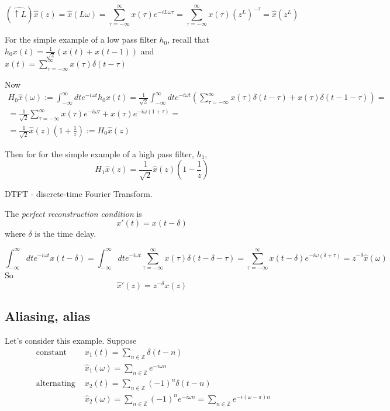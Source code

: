 \documentclass[twoside]{amsart}
\theoremstyle{plain}
\theoremstyle{definition}
\theoremstyle{remark}
\numberwithin{equation}{section}
\begin{document}
\begin{equation}
  (\widehat{\uparrow L})\widehat{x}(z) = \widehat{x}(L\omega) = \sum_{\tau=-\infty}^{\infty} x(\tau) e^{-iL\omega \tau} = \sum_{\tau=-\infty}^{\infty}x(\tau) (z^L)^{-\tau} = \widehat{x}(z^L)
\end{equation}

For the simple example of a low pass filter $h_0$, recall that $h_0x(t) = \frac{1}{\sqrt{2}} (x(t) + x(t-1))$ and \\
$x(t) = \sum_{\tau=-\infty}^{\infty}x(\tau) \delta(t-\tau)$

Now
\[
\begin{gathered}
H_0\widehat{x}(\omega) := \int_{-\infty}^{\infty}dt e^{-i \omega t} h_0x(t) = \frac{1}{\sqrt{2}} \int_{-\infty}^{\infty} dt e^{-i \omega t} \left( \sum_{\tau=-\infty}^{\infty} x(\tau) \delta(t-\tau) + x(\tau) \delta(t-1-\tau) \right) = \\
= \frac{1}{\sqrt{2}} \sum_{\tau=-\infty}^{\infty}x(\tau) e^{-i\omega \tau} + x(\tau) e^{-i \omega(1+\tau) } = \\
= \frac{1}{\sqrt{2}} \widehat{x}(z) \left( 1 + \frac{1}{z} \right) := H_0\widehat{x}(z)
\end{gathered}
\]

Then for for the simple example of a high pass filter, $h_1$,
\[
H_1\widehat{x}(z) = \frac{1}{\sqrt{2}} \widehat{x}(z)\left( 1- \frac{1}{z} \right)
\]

DTFT - discrete-time Fourier Transform.  

The \emph{perfect reconstruction condition} is
\[
x'(t) = x(t-\delta)
\]
where $\delta$ is the time delay.  

\[
\int_{-\infty}^{\infty}dt e^{-i\omega t} x(t-\delta) = \int_{-\infty}^{\infty}dt e^{-i\omega t} \sum_{\tau=-\infty}^{\infty} x(\tau) \delta(t- \delta - \tau ) = \sum_{\tau=-\infty}^{\infty} x(t-\delta) e^{-i \omega (\delta +\tau) } = z^{-\delta} \widehat{x}(\omega )
\]
So
\[
\widehat{x}'(z) = z^{-\delta}x(z)
\]




\subsection{Aliasing, alias}

Let's consider this example.  Suppose 
\[
\begin{aligned}
\text{ constant }  & x_1(t) = \sum_{n\in \mathbb{Z}} \delta(t-n) \\   
  & \widehat{x}_1(\omega) = \sum_{n\in \mathbb{Z}} e^{-i \omega n } \\ 
\text{ alternating }  & x_2(t) = \sum_{n\in \mathbb{Z}} (-1)^n \delta(t-n) \\ 
  & \widehat{x}_2(\omega) = \sum_{n\in \mathbb{Z}}(-1)^n e^{-i \omega n } = \sum_{n\in \mathbb{Z}} e^{-i ( \omega - \pi ) n }
\end{aligned}
\]
\end{document}
